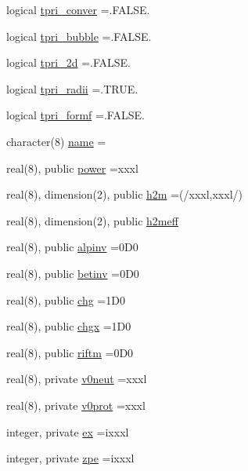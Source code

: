 \begin{DoxyCompactItemize}
logical \hyperlink{namespacedynpar_a96bc04198ad8726fd16f53a6f61c2f7a}{tpri\+\_\+conver} =.F\+A\+L\+S\+E.
\item 
logical \hyperlink{namespacedynpar_aa0043c33177eb376646420545d40b387}{tpri\+\_\+bubble} =.F\+A\+L\+S\+E.
\item 
logical \hyperlink{namespacedynpar_a07923fcee00bb618e690f652ec5ba62b}{tpri\+\_\+2d} =.F\+A\+L\+S\+E.
\item 
logical \hyperlink{namespacedynpar_a6e3c31345887781dcf51743c54942fdd}{tpri\+\_\+radii} =.T\+R\+U\+E.
\item 
logical \hyperlink{namespacedynpar_a588c8d0002ec334ca2215ec00c6f3724}{tpri\+\_\+formf} =.F\+A\+L\+S\+E.
\item 
character(8) \hyperlink{namespacedynpar_a83d064b3d6c076b1252ddd73abe88d54}{name} =\textquotesingle{}\textquotesingle{}
\item 
real(8), public \hyperlink{namespacedynpar_a275f6e0333127ac2efd1cb81989daf41}{power} =xxxl
\item 
real(8), dimension(2), public \hyperlink{namespacedynpar_a78acc8d97e315a306429696f781455ad}{h2m} =(/xxxl,xxxl/)
\item 
real(8), dimension(2), public \hyperlink{namespacedynpar_a204c595b7c821e702706ea2aeaa073f6}{h2meff}
\item 
real(8), public \hyperlink{namespacedynpar_afc4b5b27793095c01311c4d69c9c6642}{alpinv} =0\+D0
\item 
real(8), public \hyperlink{namespacedynpar_a67124410de445b1ff3dc681668a39f0c}{betinv} =0\+D0
\item 
real(8), public \hyperlink{namespacedynpar_a8b133f1921af7be7f2564e2a60e693f0}{chg} =1\+D0
\item 
real(8), public \hyperlink{namespacedynpar_a7b67156cd9a853a9e1b081318599d47a}{chgx} =1\+D0
\item 
real(8), public \hyperlink{namespacedynpar_adeb7487b44f19e9008cc8b3475503559}{riftm} =0\+D0
\item 
real(8), private \hyperlink{namespacedynpar_a656bd2f9ddcf1d701af02645567c4038}{v0neut} =xxxl
\item 
real(8), private \hyperlink{namespacedynpar_a2b76f1e73803ee77254ad356dd9054d4}{v0prot} =xxxl
\item 
integer, private \hyperlink{namespacedynpar_acb60a62a18f7078e85a07b2ecf5a6494}{ex} =ixxxl
\item 
integer, private \hyperlink{namespacedynpar_a51648067194ef0a15f4788803ad9dc15}{zpe} =ixxxl
\item 

\end{DoxyCompactItemize}

